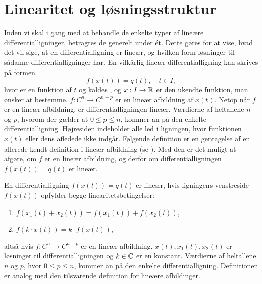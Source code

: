 \section{Linearitet og løsningsstruktur} \label{sek.linstruk1}

Inden vi skal i gang med at behandle de enkelte typer af lineære differentialligninger, betragtes de generelt under ét. Dette gøres for at vise, hvad det vil sige, at en differentialligning er lineær, og hvilken form løsninger til sådanne differentialligninger har. \bs
En vilkårlig lineær differentialligning kan skrives på formen
\begin{equation}
f(x(t)) = q(t), \quad t \in I,
\end{equation}
hvor  er en funktion af $ t $ og kaldes , og $ x: I \rightarrow \mathbb{R} $ er den ukendte funktion, man ønsker at bestemme. $ f: C^{n} \rightarrow C^{n-p} $ er en lineær afbildning af $ x(t) $. Netop når $ f $ er en lineær afbildning, er differentialligningen lineær. Værdierne af heltallene $ n $ og $ p $, hvorom der gælder at $ 0 \leq p \leq n $, kommer an på den enkelte differentialligning. Højresiden indeholder alle led i ligningen, hvor funktionen $ x(t) $ eller dens afledede ikke indgår. \bs
Følgende definition er en gentagelse af en allerede kendt definition i lineær afbildning (se ). Med den er det muligt at afgøre, om $ f $ er en lineær afbildning, og derfor om differentialligningen $ f(x(t)) = q(t) $ er lineær.

\begin{definition} \label{saet.lindiff1}
En differentialligning $ f(x(t)) = q(t) $ er lineær, hvis ligningens venstreside $ f(x(t)) $ opfylder begge linearitetsbetingelser:
\begin{enumerate}
\item $ f( x_1(t) + x_2(t) ) = f( x_1(t) ) + f( x_2(t) ) $,
\item $ f(k \cdot x(t)) = k \cdot f(x(t)) $,
\end{enumerate}
altså hvis $ f: C^n \rightarrow C^{n-p} $ er en lineær afbildning. $ x(t),x_1(t),x_2(t) $ er løsninger til differentialligningen og $ k \in \mathbb{C} $ er en konstant. Værdierne af heltallene $ n $ og $ p $, hvor $ 0 \leq p \leq n $, kommer an på den enkelte differentialligning. Definitionen er analog med den tilsvarende definition for lineære afbildinger.
\end{definition}

